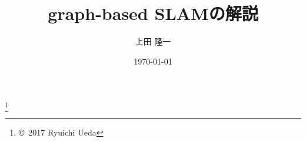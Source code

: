 \documentclass[11pt,a4paper]{jsarticle}
\title{graph-based SLAMの解説}
\author{上田 隆一}
\date{\today}
\begin{document}
\maketitle

\footnote[0]{\copyright\ 2017 Ryuichi Ueda}
%
%

%
%
\begin{footnotesize}


\end{footnotesize}
\end{document}
